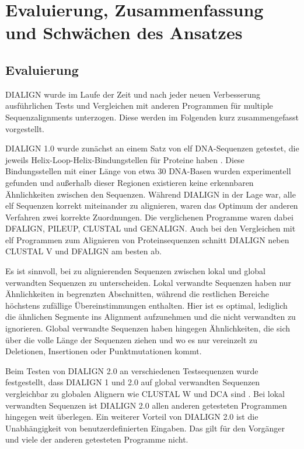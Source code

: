 \section{Evaluierung, Zusammenfassung und Schwächen des Ansatzes}

\subsection{Evaluierung}

DIALIGN	wurde im Laufe der Zeit und nach jeder neuen Verbesserung ausführlichen Tests und Vergleichen mit anderen Programmen für multiple Sequenzalignments unterzogen. Diese werden im Folgenden kurz zusammengefasst vorgestellt.

DIALIGN 1.0 wurde zunächst an einem Satz von elf DNA-Sequenzen getestet, die jeweils Helix-Loop-Helix-Bindungstellen für Proteine haben \cite{mdw96}. Diese Bindungsstellen mit einer Länge von etwa 30 DNA-Basen wurden experimentell gefunden und außerhalb dieser Regionen existieren keine erkennbaren Ähnlichkeiten zwischen den Sequenzen. Während DIALIGN in der Lage war, alle elf Sequenzen korrekt miteinander zu alignieren, waren das Optimum der anderen Verfahren zwei korrekte Zuordnungen. Die verglichenen Programme waren dabei DFALIGN, PILEUP, CLUSTAL und GENALIGN. Auch bei den Vergleichen mit elf Programmen zum Alignieren von Proteinsequenzen schnitt DIALIGN neben CLUSTAL V und DFALIGN am besten ab.

Es ist sinnvoll, bei zu alignierenden Sequenzen zwischen lokal und global verwandten Sequenzen zu unterscheiden. Lokal verwandte Sequenzen haben nur Ähnlichkeiten in begrenzten Abschnitten, während die restlichen Bereiche höchstens zufällige Übereinstimmungen enthalten. Hier ist es optimal, lediglich die ähnlichen Segmente ins Alignment aufzunehmen und die nicht verwandten zu ignorieren. Global verwandte Sequenzen haben hingegen Ähnlichkeiten, die sich über die volle Länge der Sequenzen ziehen und wo es nur vereinzelt zu Deletionen, Insertionen oder Punktmutationen kommt.

Beim Testen von DIALIGN 2.0 an verschiedenen Testsequenzen wurde festgestellt, dass DIALIGN 1 und 2.0 auf global verwandten Sequenzen vergleichbar zu globalen Alignern wie CLUSTAL W und DCA sind \cite{mahd98}. Bei lokal verwandten Sequenzen ist DIALIGN 2.0 allen anderen getesteten Programmen hingegen weit überlegen. Ein weiterer Vorteil von DIALIGN 2.0 ist die Unabhängigkeit von benutzerdefinierten Eingaben. Das gilt für den Vorgänger und viele der anderen getesteten Programme nicht.

